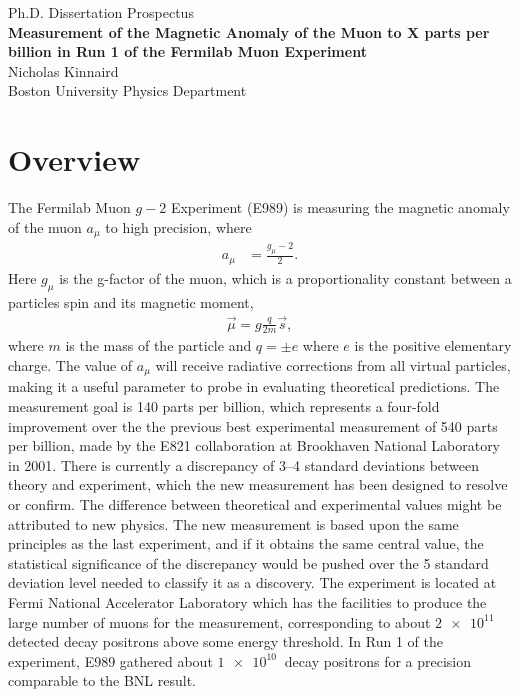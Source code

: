 \documentclass[12pt,letterpaper]{article}
\def\gmtwo{$g-2$\xspace}
\def\amu{$a_{\mu}$\xspace}
\begin{document}
\begin{center}
\Large{Ph.D. Dissertation Prospectus} \\\vspace{5mm}
\textbf{\Large{Measurement of the Magnetic Anomaly of the Muon to X parts per billion in Run 1 of the Fermilab Muon  Experiment}} \\\vspace{5mm}
\large{Nicholas Kinnaird} \\\vspace{5mm}
\large{Boston University Physics Department} \\\vspace{5mm}
\end{center}


\section*{Overview}


The Fermilab Muon \gmtwo Experiment (E989) is measuring the magnetic anomaly of the muon \amu to high precision, where  
		\begin{align}
            a_{\mu} &= \frac{g_{\mu}-2}{2}.
        \label{eq:anamoly}
		\end{align}
Here $g_{\mu}$ is the g-factor of the muon, which is a proportionality constant between a particles spin and its magnetic moment, 
		\begin{align}
            \vec{\mu} = g \frac{q}{2m} \vec{s},
        \label{eq:magneticmoment}
		\end{align}
where $m$ is the mass of the particle and $q = \pm e$ where $e$ is the positive elementary charge. The value of $a_{\mu}$ will receive radiative corrections from all virtual particles, making it a useful parameter to probe in evaluating theoretical predictions. The measurement goal is 140 parts per billion, which represents a four-fold improvement over the the previous best experimental measurement of 540 parts per billion, made by the E821 collaboration at Brookhaven National Laboratory in 2001. There is currently a discrepancy of \SIrange{3}{4}{} standard deviations between theory and experiment, which the new measurement has been designed to resolve or confirm. The difference between theoretical and experimental values might be attributed to new physics. The new measurement is based upon the same principles as the last experiment, and if it obtains the same central value, the statistical significance of the discrepancy would be pushed over the 5 standard deviation level needed to classify it as a discovery. The experiment is located at Fermi National Accelerator Laboratory which has the facilities to produce the large number of muons for the measurement, corresponding to about $\SI{2e11}{}$ detected decay positrons above some energy threshold. In Run 1 of the experiment, E989 gathered about $\SI{1e10}{}$ decay positrons for a precision comparable to the BNL result.
\end{document}
